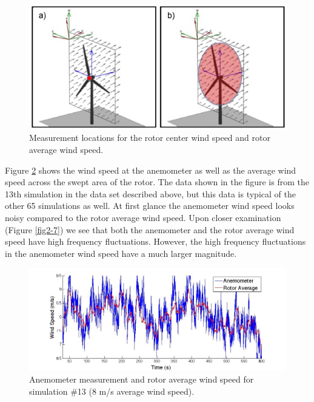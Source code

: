 \begin{figure}[htbp]
	\centering
		\includegraphics[width = \linewidth]{Figures/ch2Figures/fig2-4.jpg}
		
	\caption{Measurement locations for the rotor center wind speed and rotor average wind speed.}
	\label{fig2-4}
\end{figure}

Figure \ref{fig2-6} shows the wind speed at the anemometer as well as the average wind speed across the swept area of the rotor. The data shown in the figure is from the 13th simulation in the data set described above, but this data is typical of the other 65 simulations as well. At first glance the anemometer wind speed looks noisy compared to the rotor average wind speed. Upon closer examination (Figure \ref{fig2-7}) we see that both the anemometer and the rotor average wind speed have high frequency fluctuations. However, the high frequency fluctuations in the anemometer wind speed have a much larger magnitude. 

\begin{figure}[htbp]
	\centering
		\includegraphics[width = \linewidth]{Figures/ch2Figures/fig2-6.jpg}
		
	\caption{Anemometer measurement and rotor average wind speed for simulation \#13 (8 m/s average wind speed).}
	\label{fig2-6}
\end{figure}


